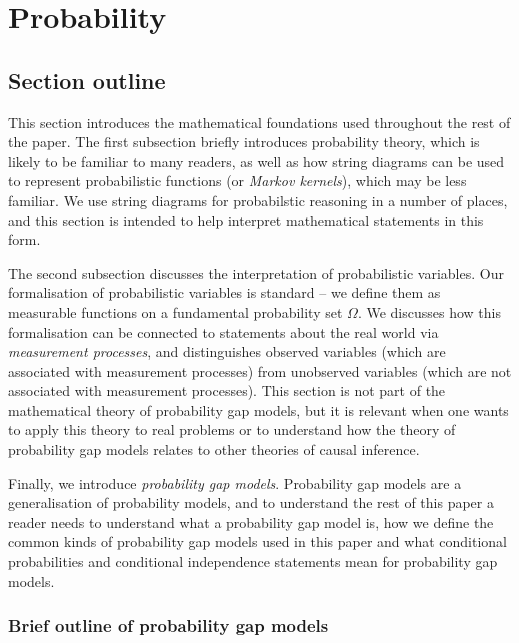 

\section{Probability}\label{sec:vague_variables}

\subsection{Section outline}


This section introduces the mathematical foundations used throughout the rest of the paper. The first subsection briefly introduces probability theory, which is likely to be familiar to many readers, as well as how string diagrams can be used to represent probabilistic functions (or \emph{Markov kernels}), which may be less familiar. We use string diagrams for probabilstic reasoning in a number of places, and this section is intended to help interpret mathematical statements in this form.

The second subsection discusses the interpretation of probabilistic variables. Our formalisation of probabilistic variables is standard -- we define them as measurable functions on a fundamental probability set $\Omega$. We discusses how this formalisation can be connected to statements about the real world via \emph{measurement processes}, and distinguishes observed variables (which are associated with measurement processes) from unobserved variables (which are not associated with measurement processes). This section is not part of the mathematical theory of probability gap models, but it is relevant when one wants to apply this theory to real problems or to understand how the theory of probability gap models relates to other theories of causal inference.

Finally, we introduce \emph{probability gap models}. Probability gap models are a generalisation of probability models, and to understand the rest of this paper a reader needs to understand what a probability gap model is, how we define the common kinds of probability gap models used in this paper and what conditional probabilities and conditional independence statements mean for probability gap models.

\subsubsection{Brief outline of probability gap models}

